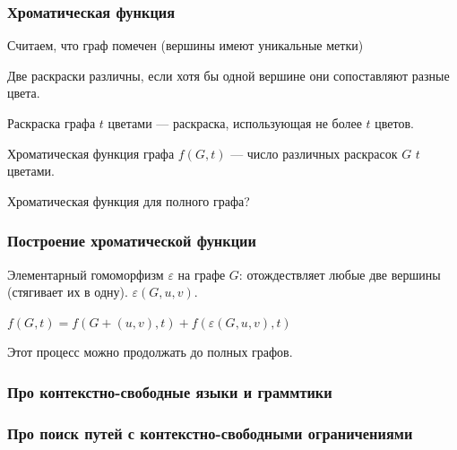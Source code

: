 \documentclass[xcolor=table]{beamer}
\begin{document}
\begin{frame} \frametitle{Хроматическая функция}
Считаем, что граф помечен (вершины имеют уникальные метки)
\begin{definition}
Две раскраски различны, если хотя бы одной вершине они сопоставляют разные цвета.
\end{definition}
\pause

\begin{definition}
Раскраска графа $t$ цветами --- раскраска, использующая не более $t$ цветов.
\end{definition}
\pause

\begin{definition}
Хроматическая функция графа $f(G,t)$ --- число различных раскрасок $G$ $t$ цветами.
\end{definition}
\pause
Хроматическая функция для полного графа?
\end{frame}


\begin{frame} \frametitle{Построение хроматической функции}

\begin{definition}
Элементарный гомоморфизм $\varepsilon$ на графе $G$: отождествляет любые две вершины (стягивает их в одну).
$\varepsilon(G,u,v)$.
\end{definition}
\pause

\begin{theorem}
$f(G,t) = f(G + (u,v), t) + f(\varepsilon(G,u,v),t)$
\end{theorem}
\pause
Этот процесс можно продолжать до полных графов. 

\end{frame}

\begin{frame} \frametitle{Про контекстно-свободные языки и граммтики}


\end{frame}


\begin{frame} \frametitle{Про поиск путей с контекстно-свободными ограничениями}


\end{frame}
\end{document}
